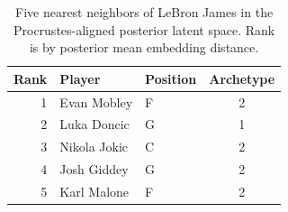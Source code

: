 \begin{table}[htbp]
  \centering\small
  \begin{tabular}{rllc}
    \toprule
    Rank & Player & Position & Archetype \\
    \midrule
    1 & Evan Mobley & F & 2 \\
    2 & Luka Doncic & G & 1 \\
    3 & Nikola Jokic & C & 2 \\
    4 & Josh Giddey & G & 2 \\
    5 & Karl Malone & F & 2 \\
    \bottomrule
  \end{tabular}
  \caption{Five nearest neighbors of LeBron James in the Procrustes-aligned posterior latent space. Rank is by posterior mean embedding distance.}
  \label{tab:LeBron_James_neighbors}
\end{table}

